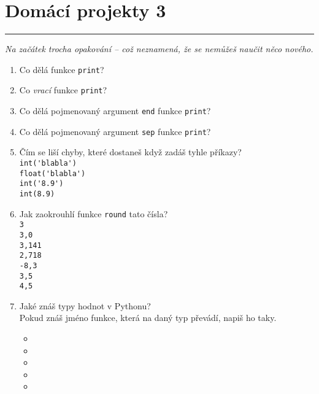 \documentclass[a4paper,10pt]{article}
\newcommand\plsetno{3}
\newcommand\startsection[1]{
     \vspace{0.2ex}
    \hrule
    {\fontspec{Oxygen} \tiny
     \vspace{-1ex}
     \emph{#1}
     \vspace{-1.5em}
    }
}
\begin{document}
\section*{Domácí projekty \plsetno}

\startsection{Na začátek trocha opakování – což neznamená, že se nemůžeš naučit něco nového.}

\begin{enumerate}
\item Co dělá funkce \verb+print+?

\item Co \emph{vrací} funkce \verb+print+?

\item Co dělá pojmenovaný argument \texttt{end} funkce \verb+print+?

\item Co dělá pojmenovaný argument \texttt{sep} funkce \verb+print+?

\item Čím se liší chyby, které dostaneš když zadáš tyhle příkazy?
    \\\verb+int('blabla')+
    \\\verb+float('blabla')+
    \\\verb+int('8.9')+
    \\\verb+int(8.9)+

\item Jak zaokrouhlí funkce \verb+round+ tato čísla?
    \\\verb+3+
    \\\verb+3,0+
    \\\verb+3,141+
    \\\verb+2,718+
    \\\verb+-8,3+
    \\\verb+3,5+
    \\\verb+4,5+

\item Jaké znáš typy hodnot v Pythonu?
    \\Pokud znáš jméno funkce, která na daný typ převádí, napiš ho taky.
    \begin{itemize}
        \item
        \item
        \item
        \item
        \item
    \end{itemize}

\end{enumerate}
\end{document}
